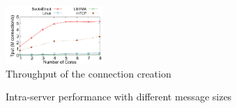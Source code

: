 \begin{figure}[htpb]
	\centering
	\includegraphics[width=0.33\textwidth]{eval/microbenchmark/conn-setup-tput.pdf}
	\caption{Throughput of the connection creation}
	\label{fig:eval-conn-setup-tput}
\end{figure}


\begin{figure}[htpb]
	\centering
	
	\caption{Intra-server performance with different message sizes}
	\label{fig:eval-msgsize-intra}
\end{figure}

